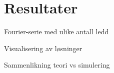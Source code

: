 \section{Resultater}
Fourier-serie med ulike antall ledd

Visualisering av løsninger

Sammenlikning teori vs simulering
